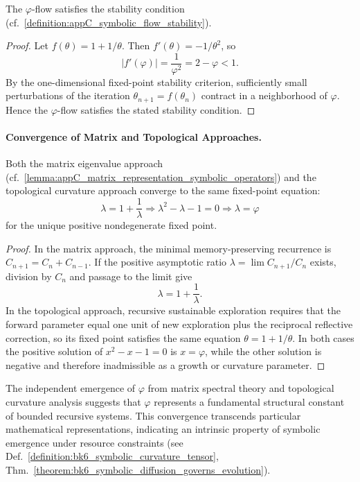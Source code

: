 \begin{lemma}
\label{lemma:appC_stability_phi_flow}
The $\varphi$-flow satisfies the stability condition (cf.~\ref{definition:appC_symbolic_flow_stability}).
\end{lemma}

\begin{proof}
\label{proof:appC_stability_phi_flow}
Let $f(\theta)=1+1/\theta$. Then $f'(\theta)=-1/\theta^2$, so
\[
|f'(\varphi)|=\frac{1}{\varphi^2}=2-\varphi<1.
\]
By the one-dimensional fixed-point stability criterion, sufficiently small
perturbations of the iteration $\theta_{n+1}=f(\theta_n)$ contract in a
neighborhood of $\varphi$. Hence the $\varphi$-flow satisfies the stated stability
condition.
\end{proof}

\paragraph{Convergence of Matrix and Topological Approaches.}
\label{subsec:appC_convergence_matrix_topological}

\begin{theorem}
\label{theorem:appC_unified_recursive_fixed_point}
Both the matrix eigenvalue approach (cf.~\ref{lemma:appC_matrix_representation_symbolic_operators}) and the topological curvature approach converge to the same fixed-point equation:
\[
\lambda = 1 + \frac{1}{\lambda} \Rightarrow \lambda^2 - \lambda - 1 = 0 \Rightarrow \lambda = \varphi
\]
for the unique positive nondegenerate fixed point.
\end{theorem}

\begin{proof}
\label{proof:appC_unified_recursive_fixed_point}
In the matrix approach, the minimal memory-preserving recurrence is
$C_{n+1}=C_n+C_{n-1}$. If the positive asymptotic ratio
$\lambda=\lim C_{n+1}/C_n$ exists, division by $C_n$ and passage to the limit give
\[
\lambda=1+\frac{1}{\lambda}.
\]
In the topological approach, recursive sustainable exploration requires that the
forward parameter equal one unit of new exploration plus the reciprocal
reflective correction, so its fixed point satisfies the same equation
$\theta=1+1/\theta$. In both cases the positive solution of
$x^2-x-1=0$ is $x=\varphi$, while the other solution is negative and therefore
inadmissible as a growth or curvature parameter.
\end{proof}

\begin{scholium}
\label{scholium:appC_structural_universality_phi}
The independent emergence of $\varphi$ from matrix spectral theory and topological curvature analysis suggests that $\varphi$ represents a fundamental structural constant of bounded recursive systems. This convergence transcends particular mathematical representations, indicating an intrinsic property of symbolic emergence under resource constraints (see Def.~\ref{definition:bk6_symbolic_curvature_tensor}, Thm.~\ref{theorem:bk6_symbolic_diffusion_governs_evolution}).
\end{scholium}

